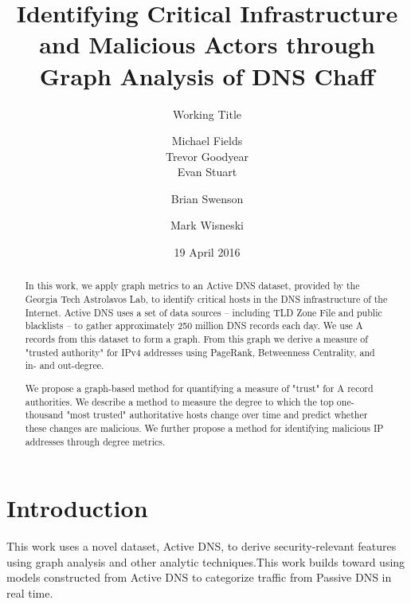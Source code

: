 \documentclass{acm_proc_article-sp}
\begin{document}
\title{Identifying Critical Infrastructure and Malicious Actors through Graph Analysis of DNS Chaff}
\subtitle{ Working Title}

\author{
\alignauthor
Michael Fields\\
\alignauthor
Trevor Goodyear\\
\alignauthor
Evan Stuart\\
\and %
\alignauthor
Brian Swenson\\
\and %
\alignauthor
Mark Wisneski\\
}

\date{19 April 2016}


\maketitle
\begin{abstract}
In this work, we apply graph metrics to an Active DNS dataset, provided by the Georgia Tech Astrolavos Lab, to identify critical hosts in the DNS infrastructure of the Internet. Active DNS uses a set of data sources -- including TLD Zone File and public blacklists -- to gather approximately 250 million DNS records each day. We use A records from this dataset to form a graph. From this graph we derive a measure of "trusted authority" for IPv4 addresses using PageRank, Betweenness Centrality, and in- and out-degree.

We propose a graph-based method for quantifying a measure of "trust" for A record authorities. We describe a method to measure the degree to which the top one-thousand "most trusted" authoritative hosts change over time and predict whether these changes are malicious. We further propose a method for identifying malicious IP addresses through degree metrics.
\end{abstract}


\section{Introduction}
This work uses a novel dataset, Active DNS, to derive security-relevant features using graph analysis and other analytic techniques.This work builds toward using models constructed from Active DNS to categorize traffic from Passive DNS in real time.
\end{document}
